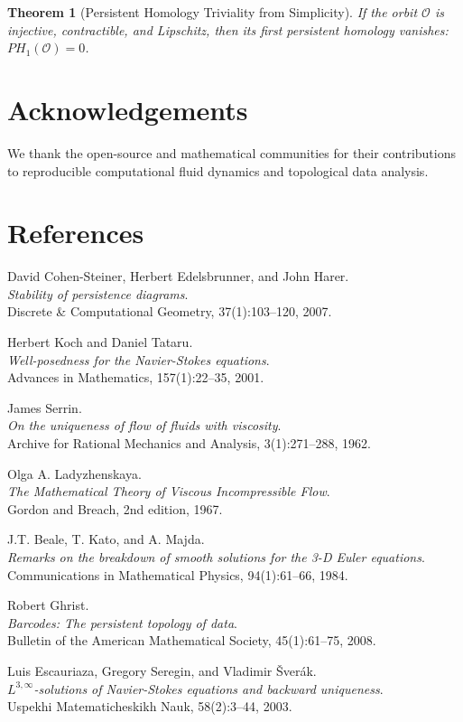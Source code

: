 \documentclass[11pt]{article}
\newtheorem{theorem}{Theorem}[section]
\theoremstyle{definition}
\begin{document}
\begin{theorem}[Persistent Homology Triviality from Simplicity]
If the orbit $\mathcal{O}$ is injective, contractible, and Lipschitz, then its first persistent homology vanishes: $PH_1(\mathcal{O}) = 0$.
\end{theorem}

\section*{Acknowledgements}
We thank the open-source and mathematical communities for their contributions to reproducible computational fluid dynamics and topological data analysis.

\section*{References}
\begin{thebibliography}{9}

David Cohen-Steiner, Herbert Edelsbrunner, and John Harer.\\
\textit{Stability of persistence diagrams}.\\
Discrete \& Computational Geometry, 37(1):103--120, 2007.

Herbert Koch and Daniel Tataru.\\
\textit{Well-posedness for the Navier-Stokes equations}.\\
Advances in Mathematics, 157(1):22--35, 2001.

James Serrin.\\
\textit{On the uniqueness of flow of fluids with viscosity}.\\
Archive for Rational Mechanics and Analysis, 3(1):271--288, 1962.

Olga A. Ladyzhenskaya.\\
\textit{The Mathematical Theory of Viscous Incompressible Flow}.\\
Gordon and Breach, 2nd edition, 1967.

J.T. Beale, T. Kato, and A. Majda.\\
\textit{Remarks on the breakdown of smooth solutions for the 3-D Euler equations}.\\
Communications in Mathematical Physics, 94(1):61--66, 1984.

Robert Ghrist.\\
\textit{Barcodes: The persistent topology of data}.\\
Bulletin of the American Mathematical Society, 45(1):61--75, 2008.

Luis Escauriaza, Gregory Seregin, and Vladimir \v{S}ver\'ak.\\
\textit{$L^{3,\infty}$-solutions of Navier-Stokes equations and backward uniqueness}.\\
Uspekhi Matematicheskikh Nauk, 58(2):3--44, 2003.

\end{thebibliography}
\end{document}
